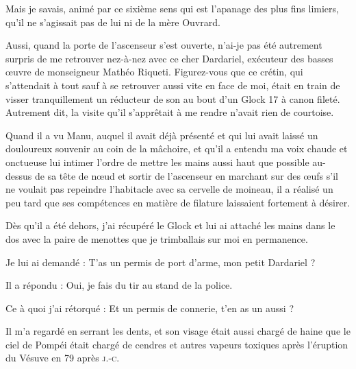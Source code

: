 Mais je savais, animé par ce sixième sens qui est l’apanage des plus fins limiers, qu’il ne s’agissait pas de lui ni de la mère Ouvrard.

\illusloflabel{}%
%
%
Aussi, quand la porte de l’ascenseur s’est ouverte, n’ai-je pas été autrement surpris de me retrouver nez-à-nez avec ce cher Dardariel, exécuteur des basses œuvre de monseigneur Mathéo Riqueti. Figurez-vous que ce crétin, qui s’attendait à tout sauf à se retrouver aussi vite en face de moi, était en train de visser tranquillement un réducteur de son au bout d’un Glock 17 à canon fileté. Autrement dit, la visite qu’il s’apprêtait à me rendre n’avait rien de courtoise.

Quand il a vu Manu, auquel il avait déjà présenté et qui lui avait laissé un douloureux souvenir au coin de la mâchoire, et qu’il a entendu ma voix chaude et onctueuse lui intimer l’ordre de mettre les mains aussi haut que possible au-dessus de sa tête de nœud et sortir de l’ascenseur en marchant sur des œufs s’il ne voulait pas repeindre l’habitacle avec sa cervelle de moineau, il a réalisé un peu tard que ses compétences en matière de filature laissaient fortement à désirer.

Dès qu’il a été dehors, j’ai récupéré le Glock et lui ai attaché les mains dans le dos avec la paire de menottes que je trimballais sur moi en permanence.

Je lui ai demandé : T’as un permis de port d’arme, mon petit Dardariel ?

Il a répondu : Oui, je fais du tir au stand de la police.

Ce à quoi j’ai rétorqué : Et un permis de connerie, t’en as un aussi ?

Il m’a regardé en serrant les dents, et son visage était aussi chargé de haine que le ciel de Pompéi était chargé de cendres et autres vapeurs toxiques après l’éruption du Vésuve en 79 après \textsc{j.-c.}

